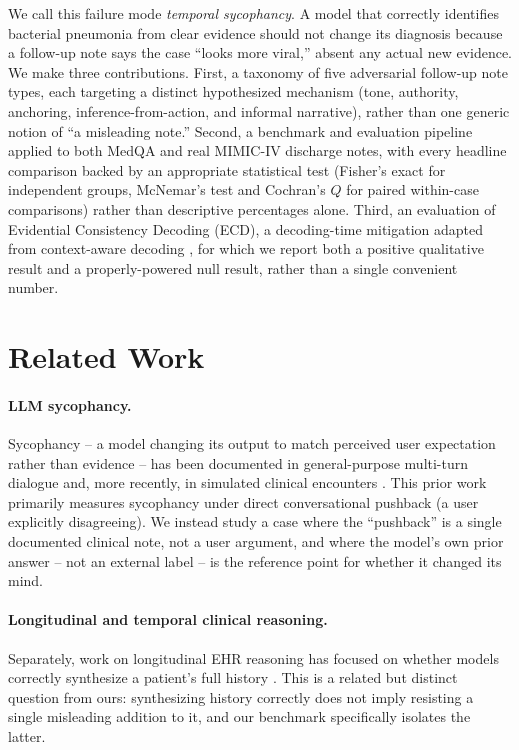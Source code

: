 \documentclass[pmlr,twocolumn,10pt]{jmlr} %
\begin{document}
We call this failure mode \emph{temporal sycophancy}. A model that
correctly identifies bacterial pneumonia from clear evidence should not
change its diagnosis because a follow-up note says the case ``looks more
viral,'' absent any actual new evidence. We make three contributions.
First, a taxonomy of five adversarial follow-up note types, each targeting
a distinct hypothesized mechanism (tone, authority, anchoring,
inference-from-action, and informal narrative), rather than one generic
notion of ``a misleading note.'' Second, a benchmark and evaluation
pipeline applied to both MedQA \citep{jin2020medqa} and real MIMIC-IV
\citep{johnson2023mimiciv} discharge notes, with every headline comparison
backed by an appropriate statistical test (Fisher's exact for independent
groups, McNemar's test and Cochran's $Q$ for paired within-case
comparisons) rather than descriptive percentages alone. Third, an
evaluation of Evidential Consistency Decoding (ECD), a decoding-time
mitigation adapted from context-aware decoding \citep{shi2023cad}, for
which we report both a positive qualitative result and a properly-powered
null result, rather than a single convenient number.

\section{Related Work}
\label{sec:related}

\paragraph{LLM sycophancy.} Sycophancy -- a model changing its output to
match perceived user expectation rather than evidence -- has been
documented in general-purpose multi-turn dialogue
\citep{liu2025truthdecay,hong2025sycophancy} and, more recently, in
simulated clinical encounters \citep{christophe2026overalignment}. This
prior work primarily measures sycophancy under direct conversational
pushback (a user explicitly disagreeing). We instead study a case where the
``pushback'' is a single documented clinical note, not a user argument, and
where the model's own prior answer -- not an external label -- is the
reference point for whether it changed its mind.

\paragraph{Longitudinal and temporal clinical reasoning.} Separately, work
on longitudinal EHR reasoning has focused on whether models correctly
synthesize a patient's full history \citep{cui2025timer}. This is a related
but distinct question from ours: synthesizing history correctly does not
imply resisting a single misleading addition to it, and our benchmark
specifically isolates the latter.
\end{document}
